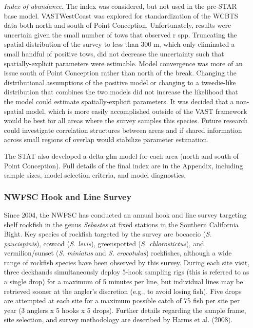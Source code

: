 \documentclass[11pt,
  english,
  a4paper,
]{article}
\begin{document}
\emph{Index of abundance.} The index was considered, but not used in the pre-STAR base model. VASTWestCoast was explored for standardization of the WCBTS data both north and south of Point Conception. Unfortunately, results were uncertain given the small number of tows that observed r spp. Truncating the spatial distribution of the survey to less than 300 m, which only eliminated a small handful of positive tows, did not decrease the uncertainty such that spatially-explicit parameters were estimable. Model convergence was more of an issue south of Point Conception rather than north of the break. Changing the distributional assumptions of the positive model or changing to a tweedie-like distribution that combines the two models did not increase the likelihood that the model could estimate spatially-explicit parameters. It was decided that a non-spatial model, which is more easily accomplished outside of the VAST framework would be best for all areas where the survey samples this species. Future research could investigate correlation structures between areas and if shared information across small regions of overlap would stabilize parameter estimation.

The STAT also developed a delta-glm model for each area (north and south of Point Conception). Full details of the final index are in the Appendix, including sample sizes, model selection criteria, and model diagnostics.


\hypertarget{nwfsc-hook-and-line-survey}{%
\subsubsection{NWFSC Hook and Line Survey}\label{nwfsc-hook-and-line-survey}}

\leavevmode\tagmcend\tagstructend

Since 2004, the NWFSC has conducted an annual hook and line survey targeting shelf rockfish in the genus \emph{Sebastes} at fixed stations in the Southern California Bight. Key species of rockfish targeted by the survey are bocaccio (\emph{S. paucispinis}), cowcod (\emph{S. levis}), greenspotted (\emph{S. chlorostictus}), and vermilion/sunset (\emph{S. miniatus} and \emph{S. crocotulus}) rockfishes, although a wide range of rockfish species have been observed by this survey. During each site visit, three deckhands simultaneously deploy 5-hook sampling rigs (this is referred to as a single drop) for a maximum of 5 minutes per line, but individual lines may be retrieved sooner at the angler's discretion (e.g., to avoid losing fish). Five drops are attempted at each site for a maximum possible catch of 75 fish per site per year (3 anglers x 5 hooks x 5 drops). Further details regarding the sample frame, site selection, and survey methodology are described by Harms et al. {(2008)\leavevmode\tagmcend\tagstructend}.
\end{document}
